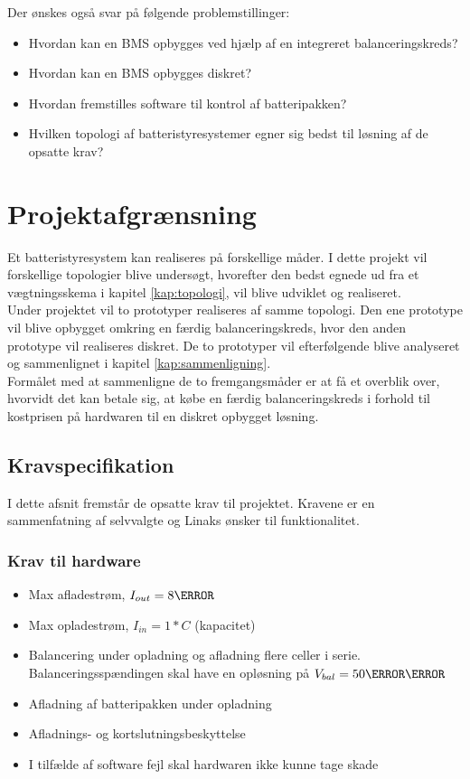 Der ønskes også svar på følgende problemstillinger: 

\begin{itemize}[noitemsep]
	\item Hvordan kan en BMS opbygges ved hjælp af en integreret balanceringskreds?
	\item Hvordan kan en BMS opbygges diskret? 
	\item Hvordan fremstilles software til kontrol af batteripakken?
	\item Hvilken topologi af batteristyresystemer egner sig bedst til løsning af de opsatte krav?
\end{itemize}

\section{Projektafgrænsning}
Et batteristyresystem kan realiseres på forskellige måder. I dette projekt vil forskellige topologier blive undersøgt, hvorefter den bedst egnede ud fra et vægtningsskema i kapitel \ref{kap:topologi}, vil blive udviklet og realiseret. 
\\

Under projektet vil to prototyper realiseres af samme topologi. Den ene prototype vil blive opbygget omkring en færdig balanceringskreds, hvor den anden prototype vil realiseres diskret. De to prototyper vil efterfølgende blive analyseret og sammenlignet i kapitel \ref{kap:sammenligning}.
\\

Formålet med at sammenligne de to fremgangsmåder er at få et overblik over, hvorvidt det kan betale sig, at købe en færdig balanceringskreds i forhold til kostprisen på hardwaren til en diskret opbygget løsning.


\subsection{Kravspecifikation} \label{afs:kravspecifikation}
I dette afsnit fremstår de opsatte krav til projektet. Kravene er en sammenfatning af selvvalgte og Linaks ønsker til funktionalitet.

\subsubsection{Krav til hardware}
\begin{itemize}[noitemsep]
	\item Max afladestrøm, $I_{out} = 8\ampere$
	\item Max opladestrøm, $I_{in} = 1*C$ (kapacitet)
	\item Balancering under opladning og afladning flere celler i serie. Balanceringsspændingen skal have en opløsning på  $V_{bal} = 50\milli\volt$
	\item Afladning af batteripakken under opladning
	\item Afladnings- og kortslutningsbeskyttelse
	\item I tilfælde af software fejl skal hardwaren ikke kunne tage skade
\end{itemize}

